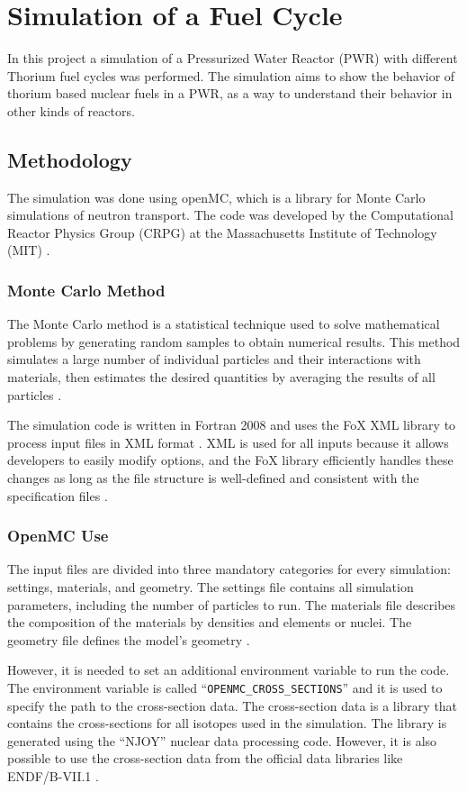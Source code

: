 \chapter{Simulation of a Fuel Cycle}
In this project a simulation of a Pressurized Water Reactor (PWR) with different Thorium fuel cycles was performed. The simulation aims to show the behavior of thorium based nuclear fuels in a PWR, as a way to understand their behavior in other kinds of reactors. 

\section{Methodology}
The simulation was done using openMC, which is a library for Monte Carlo simulations of neutron transport. The code was developed by the Computational Reactor Physics Group (CRPG) at the Massachusetts Institute of Technology (MIT) \cite{OpenMC}. 

\subsection{Monte Carlo Method}
The Monte Carlo method is a statistical technique used to solve mathematical problems by generating random samples to obtain numerical results. This method simulates a large number of individual particles and their interactions with materials, then estimates the desired quantities by averaging the results of all particles \cite{TMSR_book}.

The simulation code is written in Fortran 2008 and uses the FoX XML library to process input files in XML format \cite{OpenMC}. XML is used for all inputs because it allows developers to easily modify options, and the FoX library efficiently handles these changes as long as the file structure is well-defined and consistent with the specification files \cite{OpenMC}.

\subsection{OpenMC Use}
The input files are divided into three mandatory categories for every simulation: settings, materials, and geometry. The settings file contains all simulation parameters, including the number of particles to run. The materials file describes the composition of the materials by densities and elements or nuclei. The geometry file defines the model's geometry \cite{OpenMC}.

However, it is needed to set an additional environment variable to run the code. The environment variable is called ``\texttt{OPENMC\_CROSS\_SECTIONS}'' and it is used to specify the path to the cross-section data. The cross-section data is a library that contains the cross-sections for all isotopes used in the simulation. The library is generated using the ``NJOY'' nuclear data processing code. However, it is also possible to use the cross-section data from the official data libraries like ENDF/B-VII.1 \cite{OpenMC}.

